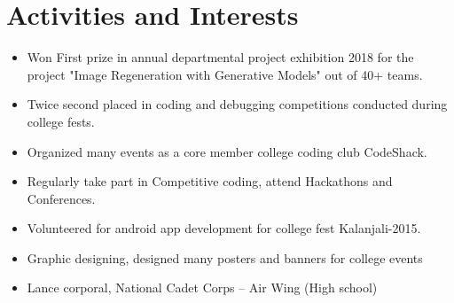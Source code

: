 \documentclass[10pt]{article}
\begin{document}
\section{Activities and Interests}
\begin{itemize}
 \itemsep0em
 \item 
 Won First prize in annual departmental project exhibition 2018 for the project "Image Regeneration with Generative Models" out of 40+ teams.
 \item 
 Twice second placed in coding and debugging competitions conducted during college fests.
 \item
 Organized many events as a core member college coding club CodeShack.
 \item
 Regularly take part in Competitive coding, attend Hackathons and Conferences.
 \item
 Volunteered for android app development for college fest Kalanjali-2015.
 \item
 Graphic designing, designed many posters and banners for college events
 \item
 Lance corporal, National Cadet Corps – Air Wing (High school)

\end{itemize}
\end{document}
